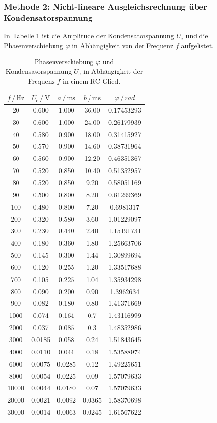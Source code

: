 \subsubsection{Methode 2: Nicht-lineare Ausgleichsrechnung über Kondensatorspannung}
In Tabelle \ref{tab:phase} ist die Amplitude der Kondensatorspannung $U_\text{c}$ und die Phasenverschiebung $\varphi$ in Abhängigkeit von der Frequenz $f$ aufgelistet.
\begin{table}
    \centering
    \begin{tabular}{ccccc}
    \toprule
    $f\,/\,\si{\hertz}$ & $U_\text{c} \,/\, \si{\volt}$ & $a\,/\,\si{\milli\second}$ & $b\,/\,\si{\milli\second}$ & $\varphi \,/\,rad$ \\
    \midrule
    20 & 0.600 & 1.000 & 36.00 &0.17453293\\
    30 & 0.600 & 1.000 & 24.00 &0.26179939\\
    40 & 0.580 & 0.900 & 18.00 &0.31415927\\
    50 & 0.570 & 0.900 & 14.60 &0.38731964 \\
    60 & 0.560 & 0.900 & 12.20 &0.46351367 \\
    70 & 0.520 & 0.850 & 10.40 &0.51352957\\
    80 & 0.520 & 0.850 & 9.20  &0.58051169 \\
    90 & 0.500 & 0.800 & 8.20  &0.61299369 \\
    100 & 0.480 & 0.800 & 7.20 &0.6981317  \\
    200 & 0.320 & 0.580 & 3.60 &1.01229097 \\
    300 & 0.230 & 0.440 & 2.40 &1.15191731 \\
    400 & 0.180 & 0.360 & 1.80 &1.25663706\\
    500 & 0.145 & 0.300 & 1.44 &1.30899694 \\
    600 & 0.120 & 0.255 & 1.20 &1.33517688 \\
    700 & 0.105 & 0.225 & 1.04 &1.35934298 \\
    800 & 0.090 & 0.200 & 0.90 &1.3962634  \\
    900 & 0.082 & 0.180 & 0.80 &1.41371669 \\
    1000 & 0.074 & 0.164 & 0.7 &1.43116999\\
    2000 & 0.037 & 0.085 & 0.3 &1.48352986 \\
    3000 & 0.0185 & 0.058 & 0.24&1.51843645 \\
    4000 & 0.0110 & 0.044 & 0.18&1.53588974 \\
    6000 & 0.0075 & 0.0285 & 0.12&1.49225651 \\
    8000 & 0.0054 & 0.0225 & 0.09&1.57079633 \\
    10000 & 0.0044 & 0.0180 & 0.07&1.57079633\\
    20000 & 0.0021 & 0.0092 & 0.0365&1.58370698 \\
    30000 & 0.0014 & 0.0063 & 0.0245&1.61567622\\
    \bottomrule
    \end{tabular}
    \caption{Phasenverschiebung $\varphi$ und Kondensatorspannung $U_\text{c}$ in Abhängigkeit der Frequenz $f$ in einem RC-Glied.}
    \label{tab:phase}
\end{table}

